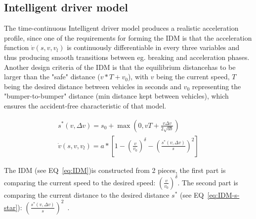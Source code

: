         \subsection{Intelligent driver model}\label{subsec:intelligent-driver-model}
            The time-continuous Intelligent driver model produces a realistic acceleration profile, since one of the requirements for forming the IDM is that the acceleration function $\dot{v}(s,v,v_l)$ is continuously differentiable in every three variables and thus producing smooth transitions between eg. breaking and acceleration phases.
            Another design criteria of the IDM is that the equilibrium distance\footnotemark has to be larger than the "safe" distance ($v*T + v_0$), with $v$ being the current speed, $T$ being the desired distance between vehicles in seconds and $v_0$ representing the "bumper-to-bumper" distance (min distance kept between vehicles), which ensures the accident-free characteristic of that model.

            \begin{align}
                s^*(v,\Delta v) = s_0 + \max\left( 0, vT + \frac{v \Delta v}{2 \sqrt{ab}} \right) \label{eq:IDM-s-star} \\
                \dot{v}(s,v,v_l) = a * \left[ 1- \left(\frac{v}{v_0}\right)^\delta  - \left( \frac{s^*(v, \Delta v)}{s} \right)^2\right] \label{eq:IDM}
            \end{align}

            The IDM (see EQ~\ref{eq:IDM})is constructed from 2 pieces, the first part is comparing the current speed to the desired speed: $\left(\frac{v}{v_0}\right)^\delta$.
            The second part is comparing the current distance to the desired distance $s^*$ (see EQ~\ref{eq:IDM-s-star}): $\left( \frac{s^*(v, \Delta v)}{s} \right)^2$~\cite{treiber2013traffic, treiber2000IDM}.

